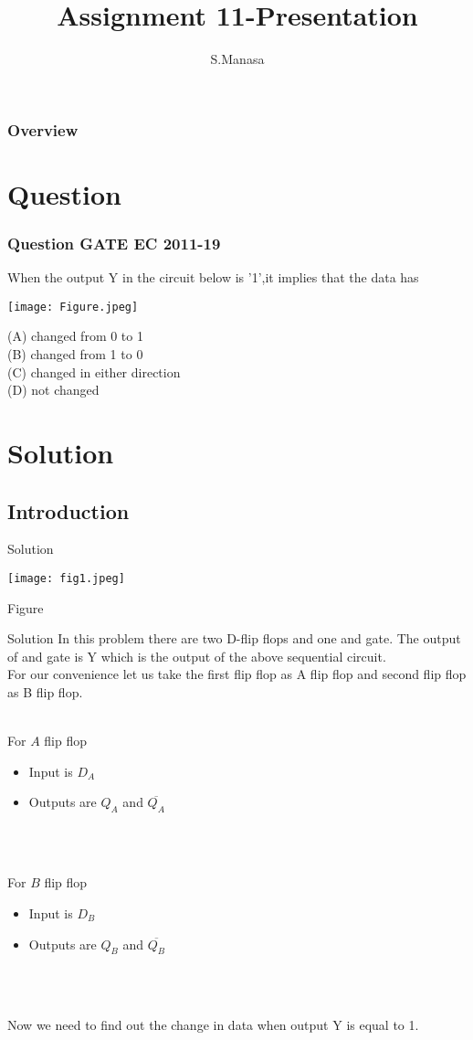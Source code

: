 \documentclass{beamer}
\title[GATE EC 2011-19]{Assignment 11-Presentation}
\author{S.Manasa}
\institute[IIIT Raichur]
{
IIIT Raichur
\medskip
\date{\today} }
\begin{document}
\begin{frame}
\titlepage 
\end{frame}

\begin{frame}
\frametitle{Overview}
\tableofcontents
\end{frame}

\section{Question}


\begin{frame}
\frametitle{Question GATE EC 2011-19}
%
When the output Y in the circuit below is '1',it implies that the data has
\break

\begin{center}
\texttt{[image: Figure.jpeg]}
\end{center}
(A) changed from 0 to 1\\
(B) changed from 1 to 0\\
(C) changed in either direction\\
(D) not changed\\


\end{frame}
\section{Solution}
\subsection{Introduction}
\begin{frame}{Solution}
\begin{center}
    \texttt{[image: fig1.jpeg]}
    \caption{Figure}
\end{center}
\end{frame}

\begin{frame}{Solution}
In this problem there are two D-flip flops and one and gate.
The output of and gate is Y which is the output of the above sequential circuit.\\ For our convenience let us take the first flip flop as A flip flop and second flip flop as B flip flop.\\~


For $A$ flip flop
\begin{itemize}
    \item Input is $D_A$
    \item Outputs are $Q_A$ and $\overline{Q_A}$
\end{itemize}
\\~

For $B$ flip flop
\begin{itemize}
    \item Input is $D_B$
    \item Outputs are $Q_B$ and $\overline{Q_B}$
\end{itemize}
 \\~
 
 Now we need to find out the change in data when output Y is equal to 1.
 \end{frame}
\end{document}
